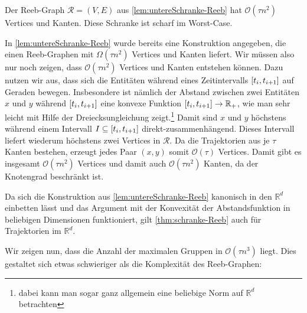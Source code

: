 \begin{satz}[name={\cite[Thm.~2]{buchin2015}},label=thm:schranke-Reeb]
	Der Reeb-Graph $\mathcal{R}=(V,E)$ aus \cref{lem:untereSchranke-Reeb} hat $\mathcal{O}(\tau n^2)$ Vertices und Kanten.
	Diese Schranke ist scharf im Worst-Case.
\end{satz}
\begin{beweis}
	In \cref{lem:untereSchranke-Reeb} wurde bereits eine Konstruktion angegeben, die einen Reeb-Graphen mit $\Omega(\tau n^2)$ Vertices und Kanten liefert.
	Wir müssen also nur noch zeigen, dass $\mathcal{O}(\tau n^2)$ Vertices und Kanten entstehen können.
	Dazu nutzen wir aus, dass sich die Entitäten während eines Zeitintervalls $\benbrace*{t_i,t_{i+1}}$ auf Geraden bewegen.
	Insbesondere ist nämlich der Abstand zwischen zwei Entitäten $x$ und $y$ während $\benbrace*{t_i,t_{i+1}}$ eine konvexe Funktion $\benbrace*{t_i,t_{i+1}} \to \mathbb{R}_+$, wie man sehr leicht mit Hilfe der Dreiecksungleichung zeigt.\footnote{dabei kann man sogar ganz allgemein eine beliebige Norm auf $\mathbb{R}^d$ betrachten}
	Damit sind $x$ und $y$ höchstens während einem Intervall $I \subseteq \benbrace*{t_i,t_{i+1}}$ direkt-zusammenhängend.
	Dieses Intervall liefert wiederum höchstens zwei Vertices in $\mathcal{R}$.
	Da die Trajektorien aus je $\tau$ Kanten bestehen, erzeugt jedes Paar $(x,y)$ somit $\mathcal{O}(\tau)$ Vertices.
	Damit gibt es insgesamt $\mathcal{O}(\tau n^2)$ Vertices und damit auch $\mathcal{O}(\tau n^2)$ Kanten, da der Knotengrad beschränkt ist.
\end{beweis}

Da sich die Konstruktion aus \cref{lem:untereSchranke-Reeb} kanonisch in den $\mathbb{R}^d$ einbetten lässt und das Argument mit der Konvexität der Abstandsfunktion in beliebigen Dimensionen funktioniert, gilt \cref{thm:schranke-Reeb} auch für Trajektorien im $\mathbb{R}^d$.

Wir zeigen nun, dass die Anzahl der maximalen Gruppen in $\mathcal{O}(\tau n^3)$ liegt.
Dies gestaltet sich etwas schwieriger als die Komplexität des Reeb-Graphen: 

